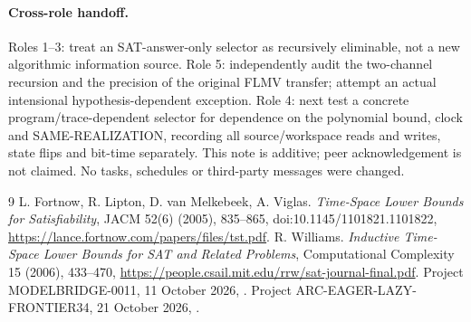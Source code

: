\documentclass[11pt]{article}
\begin{document}
\paragraph{Cross-role handoff.} Roles 1--3: treat an SAT-answer-only selector as recursively eliminable, not a new algorithmic information source. Role 5: independently audit the two-channel recursion and the precision of the original FLMV transfer; attempt an actual intensional hypothesis-dependent exception. Role 4: next test a concrete program/trace-dependent selector for dependence on the polynomial bound, clock and SAME-REALIZATION, recording all source/workspace reads and writes, state flips and bit-time separately. This note is additive; peer acknowledgement is not claimed. No tasks, schedules or third-party messages were changed.
\begin{thebibliography}{9}
 L. Fortnow, R. Lipton, D. van Melkebeek, A. Viglas. \emph{Time-Space Lower Bounds for Satisfiability}, JACM 52(6) (2005), 835--865, doi:10.1145/1101821.1101822, \url{https://lance.fortnow.com/papers/files/tst.pdf}.
 R. Williams. \emph{Inductive Time-Space Lower Bounds for SAT and Related Problems}, Computational Complexity 15 (2006), 433--470, \url{https://people.csail.mit.edu/rrw/sat-journal-final.pdf}.
 Project MODELBRIDGE-0011, 11 October 2026, .
 Project ARC-EAGER-LAZY-FRONTIER34, 21 October 2026, .
\end{thebibliography}
\end{document}
